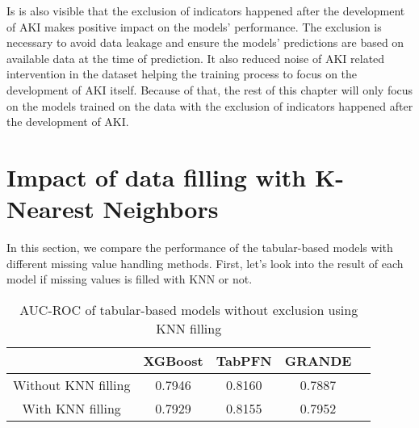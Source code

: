 \documentclass[../main.tex]{subfiles}
\begin{document}
Is is also visible that the exclusion of indicators happened after the development of \gls{AKI} makes positive impact on the models' performance.
The exclusion is necessary to avoid data leakage and ensure the models' predictions are based on available data at the time of prediction.
It also reduced noise of \gls{AKI} related intervention in the dataset helping the training process to focus on the development of \gls{AKI} itself.
Because of that, the rest of this chapter will only focus on the models trained on the data with the exclusion of indicators happened after the development of AKI.


\section{Impact of data filling with K-Nearest Neighbors}

In this section, we compare the performance of the tabular-based models with different missing value handling methods.
First, let's look into the result of each model if missing values is filled with \gls{KNN} or not.

\begin{table}[H]
    \centering
    \caption{AUC-ROC of tabular-based models without exclusion using KNN filling}
    \label{tab:knn_filling_no_limit}

    \begin{tabular}{|c|c|c|c|c|}
        \hline
        \textbf{} & 
        \textbf{XGBoost} & 
        \textbf{TabPFN} & 
        \textbf{GRANDE} \\
        \hline

        Without KNN filling & 
        0.7946 & 
        0.8160 & 
        0.7887 \\

        With KNN filling & 
        0.7929 & 
        0.8155 & 
        0.7952 \\

        \hline
    \end{tabular}

\end{table}
\end{document}
